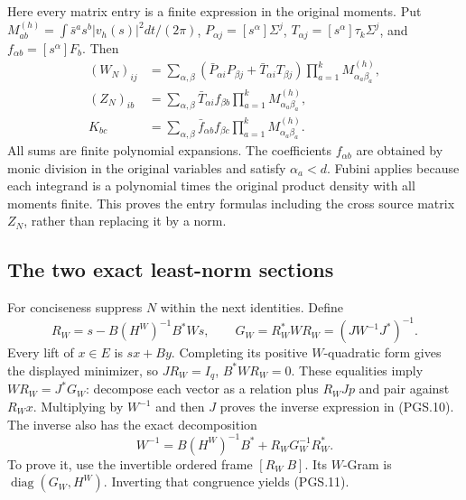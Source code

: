 Here every matrix entry is a finite expression in the original moments.
Put \(M^{(h)}_{ab}=\int\bar s^a s^b|v_h(s)|^2dt/(2\pi)\),
\(P_{\alpha j}=[s^\alpha]\Sigma^j\),
\(T_{\alpha j}=[s^\alpha]\tau_k\Sigma^j\), and
\(f_{\alpha b}=[s^\alpha]F_b\). Then
\[
\begin{aligned}
 (W_N)_{ij}
 &=\sum_{\alpha,\beta}
  (\bar P_{\alpha i}P_{\beta j}
       +\bar T_{\alpha i}T_{\beta j})
             \prod_{a=1}^k M^{(h)}_{\alpha_a\beta_a},\\
 (Z_N)_{ib}
 &=\sum_{\alpha,\beta}\bar T_{\alpha i}f_{\beta b}
             \prod_{a=1}^k M^{(h)}_{\alpha_a\beta_a},\\
 K_{bc}&=\sum_{\alpha,\beta}\bar f_{\alpha b}f_{\beta c}
             \prod_{a=1}^k M^{(h)}_{\alpha_a\beta_a}.
\end{aligned}
\tag{PGS.9}\label{GraphV2:eq:pgs-entries}
\]
All sums are finite polynomial expansions. The coefficients
\(f_{\alpha b}\) are obtained by monic division in the original
variables and satisfy \(\alpha_a<d\). Fubini applies because
each integrand is a polynomial times the original product density
with all moments finite. This proves the entry formulas including
the cross source matrix \(Z_N\), rather than replacing it by a norm.

\subsection{The two exact least-norm sections}

For conciseness suppress \(N\) within the next identities. Define
\[
 R_W=s-B(H^W)^{-1}B^*Ws,\qquad
 G_W=R_W^*WR_W=(JW^{-1}J^*)^{-1}.
\tag{PGS.10}\label{GraphV2:eq:pgs-weight-section}
\]
Every lift of \(x\in E\) is \(sx+By\). Completing its positive
\(W\)-quadratic form gives the displayed minimizer, so
\(JR_W=I_q\), \(B^*WR_W=0\). These equalities imply
\(WR_W=J^*G_W\): decompose each vector as a relation plus
\(R_WJp\) and pair against \(R_Wx\). Multiplying by \(W^{-1}\)
and then \(J\) proves the inverse expression in (PGS.10).
The inverse also has the exact decomposition
\[
 W^{-1}=B(H^W)^{-1}B^*+R_WG_W^{-1}R_W^*.
\tag{PGS.11}\label{GraphV2:eq:pgs-inverse-decomposition}
\]
To prove it, use the invertible ordered frame \([R_W\ B]\).
Its \(W\)-Gram is \(\operatorname{diag}(G_W,H^W)\).
Inverting that congruence yields (PGS.11).


